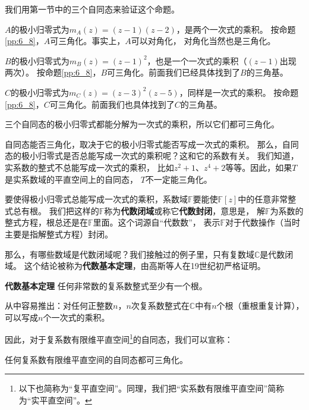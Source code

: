 \documentclass[12pt,UTF8,fontset=none]{ctexbook}
\begin{document}
我们用第一节中的三个自同态来验证这个命题。

$A$的极小归零式为$m_A(z) = (z-1)(z-2)$，是两个一次式的乘积。
按命题\ref{pp:6_8}，$A$可三角化。事实上，$A$可以对角化，
对角化当然也是三角化。

$B$的极小归零式为$m_B(z) = (z-1)^2$，也是一个一次式的乘积（$(z-1)$出现两次）。
按命题\ref{pp:6_8}，$B$可三角化。前面我们已经具体找到了$B$的三角基。

$C$的极小归零式为$m_C(z) = (z-3)^2(z-5)$，同样是一次式的乘积。
按命题\ref{pp:6_8}，$C$可三角化。前面我们也具体找到了$C$的三角基。

三个自同态的极小归零式都能分解为一次式的乘积，所以它们都可三角化。

自同态能否三角化，取决于它的极小归零式能否写成一次式的乘积。
那么，自同态的极小归零式是否总能写成一次式的乘积呢？这和它的系数有关。
我们知道，实系数的整式不总能写成一次式的乘积，
比如$z^2+1$、$z^4+2$等等。因此，如果$T$是实系数域的平直空间上的自同态，
$T$不一定能三角化。

要使得极小归零式总能写成一次式的乘积，系数域$\mathbb{F}$要能使$\mathbb{F}[z]$中的任意非常整式总有根。
我们把这样的$\mathbb{F}$称为\textbf{代数闭域}或称它\textbf{代数封闭}，意思是，
解$\mathbb{F}$为系数的整式方程，根总还是在$\mathbb{F}$里面。这个词源自“代数数”，
表示$\mathbb{F}$对于代数操作（当时主要是指解整式方程）封闭。

那么，有哪些数域是代数闭域呢？我们接触过的例子里，只有复数域$\mathbb{C}$是代数闭域。
这个结论被称为\textbf{代数基本定理}，由高斯等人在19世纪初严格证明。

\begin{pp}\textbf{代数基本定理}\label{pp:6_9}
    任何非常数的复系数整式至少有一个根。
\end{pp}
从中容易推出：对任何正整数$n$，$n$次复系数整式在$\mathbb{C}$中有$n$个根（重根重复计算），可以写成$n$个一次式的乘积。

因此，对于复系数有限维平直空间\footnote{以下也简称为“复平直空间”。同理，我们把“实系数有限维平直空间”简称为“实平直空间”。}的自同态，我们可以宣称：
\begin{pp}\label{pp:6_10}
    任何复系数有限维平直空间的自同态都可三角化。
\end{pp}
\end{document}
